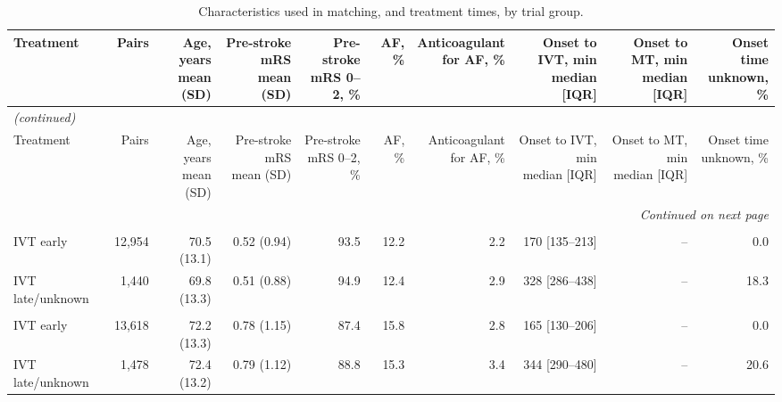 \begin{landscape}
\footnotesize
\setlength{\tabcolsep}{4pt}
\renewcommand{\arraystretch}{0.85}
\begin{longtable}{p{5.6cm}rrrrrrrrr}
\caption{Characteristics used in matching, and treatment times, by trial group.}\label{tab:baseline_matched}\\
\toprule
Treatment & Pairs & \makecell{Age, years\\ mean (SD)} & \makecell{Pre-stroke mRS\\ mean (SD)} & \makecell{Pre-stroke\\ mRS 0--2, \%} & AF, \% & \makecell{Anticoagulant\\ for AF, \%} & \makecell{Onset to IVT, min\\ median [IQR]} & \makecell{Onset to MT, min\\ median [IQR]} & \makecell{Onset time\\ unknown, \%} \\
\midrule
\endfirsthead
\multicolumn{10}{l}{\textit{(continued)}}\\
\toprule
Treatment & Pairs & \makecell{Age, years\\ mean (SD)} & \makecell{Pre-stroke mRS\\ mean (SD)} & \makecell{Pre-stroke\\ mRS 0--2, \%} & AF, \% & \makecell{Anticoagulant\\ for AF, \%} & \makecell{Onset to IVT, min\\ median [IQR]} & \makecell{Onset to MT, min\\ median [IQR]} & \makecell{Onset time\\ unknown, \%} \\
\midrule
\endhead
\midrule
\multicolumn{10}{r}{\textit{Continued on next page}}\\
\endfoot
\bottomrule
\endlastfoot
\multicolumn{10}{l}{\textbf{NIHSS 1--5}}\\
IVT early & 12,954 & 70.5 (13.1) & 0.52 (0.94) & 93.5 & 12.2 & 2.2 & 170 [135--213] & -- & 0.0 \\
IVT late/unknown & 1,440 & 69.8 (13.3) & 0.51 (0.88) & 94.9 & 12.4 & 2.9 & 328 [286--438] & -- & 18.3 \\
\addlinespace
\multicolumn{10}{l}{\textbf{NIHSS 6--10}}\\
IVT early & 13,618 & 72.2 (13.3) & 0.78 (1.15) & 87.4 & 15.8 & 2.8 & 165 [130--206] & -- & 0.0 \\
IVT late/unknown & 1,478 & 72.4 (13.2) & 0.79 (1.12) & 88.8 & 15.3 & 3.4 & 344 [290--480] & -- & 20.6 \\

\end{longtable}
\end{landscape}
